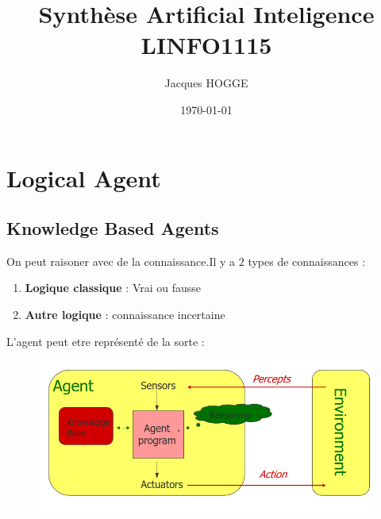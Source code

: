 \documentclass[12pt]{article}
\title{Synthèse Artificial Inteligence LINFO1115}
\author{Jacques HOGGE}
\date{\today}
\begin{document}
\maketitle
\newpage
\tableofcontents
\newpage



\newpage



\newpage



\newpage



\newpage



\newpage




			
\section{Logical Agent}
	\subsection{Knowledge Based Agents}
		On peut raisoner avec de la connaissance.Il y a 2 types de connaissances :
		\begin{enumerate}
			\item \textbf{Logique classique} : Vrai ou fausse
			\item \textbf{Autre logique} : connaissance incertaine
		\end{enumerate}
		
		L'agent peut etre représenté de la sorte : 
		\begin{figure}[htp]
			\centering
			\includegraphics[width=\textwidth]{img/KBA.png}
		\end{figure}
		
\end{document}
